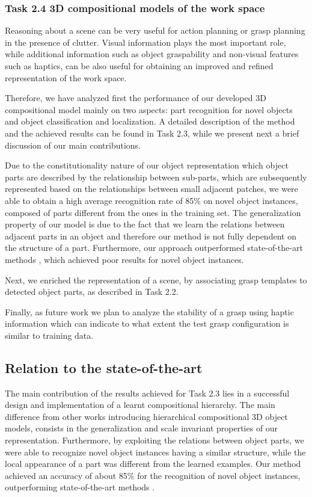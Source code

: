 \documentclass[a4paper,11pt,pdf]{pacmanreport}
\begin{document}
\subsubsection{Task 2.4 3D compositional models of the work space}

Reasoning about a scene can be very useful for action planning or grasp planning in the presence of clutter. Visual information plays the most important role, while additional information such as object graspability and non-visual features such as haptics, can be also useful for obtaining an improved and refined representation of the work space.

Therefore, we have analyzed first the performance of our developed 3D compositional model mainly on two aspects: part recognition for novel objects 
and object classification and localization. A detailed description of the method 
and the achieved results can be found in Task 2.3, while we present next a brief 
discussion of our main contributions.

Due to the constitutionality nature of our object representation which object 
parts are described by the relationship between sub-parts, which are 
subsequently represented based on the relationships between small adjacent 
patches, we were able to obtain a high average recognition rate of 85\% on novel 
object instances, composed of parts different from the ones in the training set. 
The generalization property of our model is due to the fact that we learn the 
relations between adjacent parts in an object and therefore our method is not 
fully dependent on the structure of a part. Furthermore, our approach 
outperformed state-of-the-art methods \cite{vfh}, which achieved poor results 
for novel object instances.

Next, we enriched the representation of a scene, by associating grasp templates to detected object parts, as described in Task 2.2.

Finally, as future work we plan to analyze the stability of a grasp using haptic information which can indicate to what extent the test grasp configuration is similar to training data.

\subsection{Relation to the state-of-the-art}

The main contribution of the results achieved for Task 2.3 lies in a successful design and implementation of a learnt compositional hierarchy. The main 
difference from other works \cite{rel2,comp2} introducing hierarchical 
compositional 3D object models, consists in the generalization and scale 
invariant properties of our representation. 
Furthermore, by exploiting the relations between object parts, we were able to 
recognize novel object instances having a similar structure, while the local 
appearance of a part was different from the learned examples. Our method 
achieved an accuracy of about 85\% for the recognition of novel object instances, 
outperforming state-of-the-art methods \cite{vfh}. 
\end{document}
